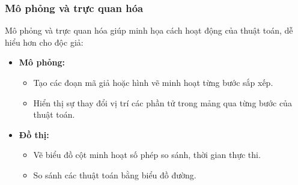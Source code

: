 \subsubsection{Mô phỏng và trực quan hóa}
Mô phỏng và trực quan hóa giúp minh họa cách hoạt động của thuật toán, dễ hiểu hơn cho độc giả:

\begin{itemize}
    \item \textbf{Mô phỏng:}
    \begin{itemize}
        \item Tạo các đoạn mã giả hoặc hình vẽ minh hoạt từng bước sắp xếp.
        \item Hiển thị sự thay đổi vị trí các phần tử trong mảng qua từng bước của thuật toán.
    \end{itemize}
    \item \textbf{Đồ thị:}
    \begin{itemize}
        \item Vẽ biểu đồ cột minh hoạt số phép so sánh, thời gian thực thi.
        \item So sánh các thuật toán bằng biểu đồ đường.
    \end{itemize}
\end{itemize}
\newpage
